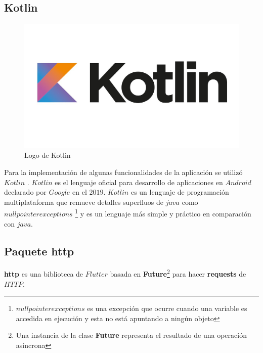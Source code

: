 

\subsection{Kotlin}

\begin{figure}[h!]
\begin{center}
\includegraphics[scale=0.11]{Graphics/images/LogoKotlin.jpg}
\caption{Logo de Kotlin}
\label{fig:rcm}

\end{center}
\end{figure}

Para la implementación de algunas funcionalidades de la aplicación se utilizó $Kotlin$ . $Kotlin$ es el lenguaje oficial para desarrollo de aplicaciones en $Android$ declarado por $Google$ en el $2019$. $Kotlin$ es un lenguaje de programación multiplataforma que remueve detalles superfluos de $java$ como $null pointer exceptions$ \footnote{$null pointer exceptions$ es una excepción que ocurre cuando una variable es accedida en ejecución y esta no está apuntando a ningún objeto} y es un lenguaje más simple y práctico en comparación con $java$.




\subsection{Paquete http}

\textbf{http} es una biblioteca de $Flutter$ basada en \textbf{Future}\footnote{Una instancia de la clase \textbf{Future} representa el resultado de una operación asíncrona} para hacer \textbf{requests} de $HTTP$.


